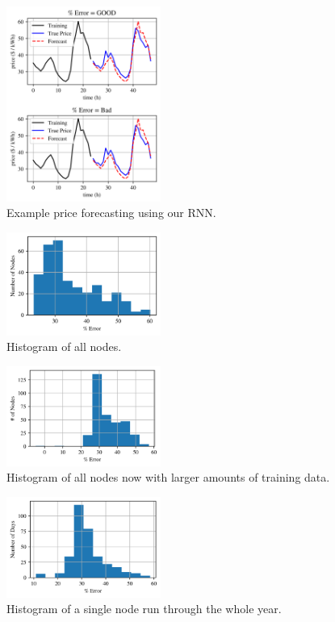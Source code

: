 \documentclass[sigconf]{acmart}
\begin{document}
\begin{figure}[h]
\includegraphics[width=0.45\textwidth]{fig_3.png}
\caption{Example price forecasting using our RNN.}
\label{fig:ex_prices}
\end{figure}

\begin{figure}[h]
\includegraphics[width=0.45\textwidth]{fig_5.png}
\caption{Histogram of all nodes.}
\label{fig:ex_prices}
\end{figure}

\begin{figure}[h]
\includegraphics[width=0.45\textwidth]{fig_6.png}
\caption{Histogram of all nodes now with larger amounts of training data.}
\label{fig:ex_prices}
\end{figure}

\begin{figure}[h]
\includegraphics[width=0.45\textwidth]{fig_7.png}
\caption{Histogram of a single node run through the whole year.}
\label{fig:ex_prices}
\end{figure}
\end{document}
